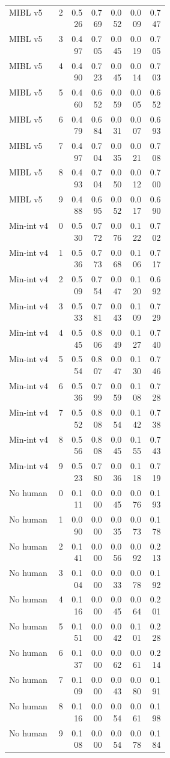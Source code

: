 \documentclass{article}
\begin{document}
\begin{center}
\begin{longtable}{p{0.31\linewidth}rrrrrr}
MIBL v5 & 2 & 0.526 & 0.769 & 0.052 & 0.009 & 0.747\\
MIBL v5 & 3 & 0.497 & 0.705 & 0.045 & 0.019 & 0.705\\
MIBL v5 & 4 & 0.490 & 0.723 & 0.045 & 0.014 & 0.703\\
MIBL v5 & 5 & 0.460 & 0.652 & 0.059 & 0.005 & 0.652\\
MIBL v5 & 6 & 0.479 & 0.684 & 0.031 & 0.007 & 0.693\\
MIBL v5 & 7 & 0.497 & 0.704 & 0.035 & 0.021 & 0.708\\
MIBL v5 & 8 & 0.493 & 0.704 & 0.050 & 0.012 & 0.700\\
MIBL v5 & 9 & 0.488 & 0.695 & 0.052 & 0.017 & 0.690\\
Min-int v4 & 0 & 0.530 & 0.772 & 0.076 & 0.122 & 0.702\\
Min-int v4 & 1 & 0.536 & 0.773 & 0.068 & 0.106 & 0.717\\
Min-int v4 & 2 & 0.509 & 0.754 & 0.047 & 0.120 & 0.692\\
Min-int v4 & 3 & 0.533 & 0.781 & 0.043 & 0.109 & 0.729\\
Min-int v4 & 4 & 0.545 & 0.806 & 0.049 & 0.127 & 0.740\\
Min-int v4 & 5 & 0.554 & 0.807 & 0.047 & 0.130 & 0.746\\
Min-int v4 & 6 & 0.536 & 0.799 & 0.059 & 0.108 & 0.728\\
Min-int v4 & 7 & 0.552 & 0.808 & 0.054 & 0.142 & 0.738\\
Min-int v4 & 8 & 0.556 & 0.808 & 0.045 & 0.155 & 0.743\\
Min-int v4 & 9 & 0.523 & 0.780 & 0.036 & 0.118 & 0.719\\
No human & 0 & 0.111 & 0.000 & 0.045 & 0.076 & 0.193\\
No human & 1 & 0.090 & 0.000 & 0.035 & 0.073 & 0.178\\
No human & 2 & 0.141 & 0.000 & 0.056 & 0.092 & 0.213\\
No human & 3 & 0.104 & 0.000 & 0.033 & 0.078 & 0.192\\
No human & 4 & 0.116 & 0.000 & 0.045 & 0.064 & 0.201\\
No human & 5 & 0.151 & 0.000 & 0.042 & 0.101 & 0.228\\
No human & 6 & 0.137 & 0.000 & 0.062 & 0.061 & 0.214\\
No human & 7 & 0.109 & 0.000 & 0.043 & 0.080 & 0.191\\
No human & 8 & 0.116 & 0.000 & 0.054 & 0.061 & 0.198\\
No human & 9 & 0.108 & 0.000 & 0.054 & 0.078 & 0.184\\

\end{longtable}
\end{center}
\end{document}
